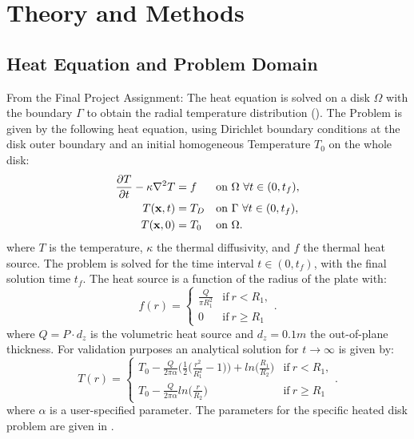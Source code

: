 \section{Theory and Methods}

\subsection{Heat Equation and Problem Domain}

From the Final Project Assignment:
The heat equation is solved on a disk $\Omega$ with the boundary $\Gamma$ to obtain the radial temperature distribution (). The Problem is given by the following heat equation, using Dirichlet boundary conditions at the disk outer boundary and an initial homogeneous Temperature $T_0$ on the whole disk:
\begin{align}
	\label{eq:Heat}
	\pp{T}{t}-\kappa \nabla^2 T &= f &&\text{on} \ \Omega \ \forall t \in (0,t_f),\\
	T(\vect{x},t) &= T_D &&\text{on} \ \Gamma \ \forall t \in (0,t_f), \label{eq:Dirichlet}\\
	T(\vect{x},0) &= T_0 &&\text{on} \ \Omega.
\end{align}
where $T$ is the temperature, $\kappa$ the thermal diffusivity, and $f$ the thermal heat source. The problem is solved for the time interval $t \in (0,t_f)$, with the final solution time $t_f$. The heat source is a function of the radius of the plate with:
\begin{equation}
	f(r) = \left\{\begin{array}{ll}\frac{Q}{\pi R_1^2} & \text{if} \ r < R_1, \\
		0 & \text{if} \ r \geq R_1 \end{array}\right . .
\end{equation}
where $Q=P \cdot d_z$ is the volumetric heat source and $d_z = 0.1m $ the out-of-plane thickness. For validation purposes an analytical solution for $t \rightarrow \infty$ is given by:
\begin{equation}
	T(r) = \left\{\begin{array}{ll} T_0-\frac{Q}{2 \pi \alpha } \big(\frac{1}{2} \big(\frac{r^2}{R_1^2} - 1\big)\big)+ln\big(\frac{R_1}{R_2}\big) & \text{if} \ r < R_1, \\
		T_0 - \frac{Q}{2 \pi \alpha } ln\big(\frac{r}{R_2}\big)& \text{if} \ r \geq R_1 \end{array}\right . .
\end{equation}
where $\alpha$ is a user-specified parameter. The parameters for the specific heated disk problem are given in .
